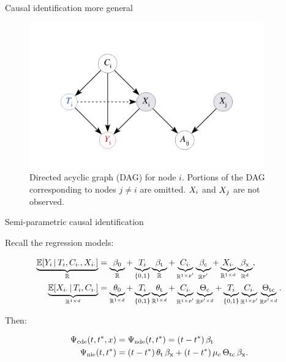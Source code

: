 \documentclass{beamer}
\theoremstyle{remark}
\begin{document}
\begin{frame}{Causal identification more general}

    \centering

    \begin{figure}
        \includegraphics[width=0.9\textwidth]{figures/mediating.png}
        \caption{Directed acyclic graph (DAG) for node $i$. Portions of the DAG corresponding to nodes $j \neq i$ are omitted. $X_i$ and $X_j$ are not observed.}
        \label{fig:mediating}
    \end{figure}

\end{frame}



\begin{frame}{Semi-parametric causal identification}

    Recall the regression models:

    \begin{equation*}
        \begin{aligned}
            \underbrace{\E[T_i, \C_{i \cdot}, \X_{i \cdot}]{Y_i}}_{\R}
             & = \underbrace{\betazero}_{\R}
            + \underbrace{T_i}_{\{0, 1\}} \underbrace{\betat}_{\R}
            + \underbrace{\C_{i \cdot}}_{\R^{1 \times p'}} \underbrace{\betac}_{\R^{p'}}
            + \underbrace{\X_{i \cdot}}_{\R^{1 \times d}} \underbrace{\betax}_{\R^d}, \\
            \underbrace{\E[T_i, \C_{i \cdot}]{\X_{i \cdot}}}_{\R^{1 \times d}}
             & = \underbrace{\thetazero}_{\R^{1 \times d}}
            + \underbrace{T_i}_{\{0, 1\}} \underbrace{\thetat}_{\R^{1 \times d}}
            + \underbrace{\C_{i \cdot}}_{\R^{1 \times p'}} \underbrace{\Thetac}_{\R^{p' \times d}}
            + \underbrace{T_i}_{\{0, 1\}} \underbrace{\C_{i \cdot}}_{\R^{1 \times p'}} \underbrace{\Thetatc}_{\R^{p' \times d}}.
        \end{aligned}
    \end{equation*}

    Then:

    \begin{align*}
        \cdef & = \ndef = \paren*{t - t^*} \, \betat                                                \\
        \nief & = \paren*{t - t^*} \, \thetat \, \betax + (t - t^*) \, \mu_c \, \Thetatc \, \betax.
    \end{align*}

\end{frame}
\end{document}
